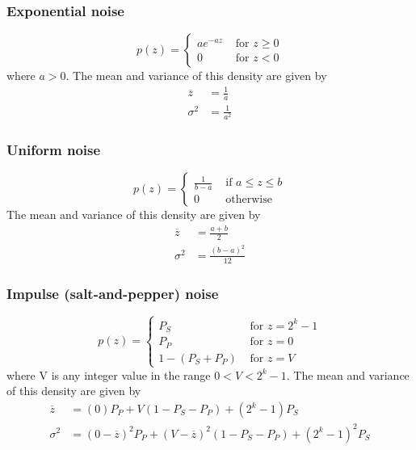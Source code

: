 	\subsubsection{Exponential noise}
		\begin{equation}
			p(z) =
				\begin{cases}
					ae^{-az} & \text{ for } z \geq 0 \\
					0 & \text{ for } z < 0
				\end{cases}
		\end{equation}
		where $a>0$. The mean and variance of this density are given by
		\begin{align}
			\overline{z} &= \frac{1}{a} \\
			\sigma^2 &= \frac{1}{a^2}
		\end{align}

	\subsubsection{Uniform noise}
		\begin{equation}
			p(z) =
				\begin{cases}
					\frac{1}{b-a} & \text{ if } a \leq z \leq b \\
					0 & \text{ otherwise }
				\end{cases}
		\end{equation}
		The mean and variance of this density are given by
		\begin{align}
			\overline{z} &= \frac{a+b}{2} \\
			\sigma^2 &= \frac{\left(b-a\right)^2}{12}
		\end{align}

	\subsubsection{Impulse (salt-and-pepper) noise}
		\begin{equation}
			p(z) =
				\begin{cases}
					P_S & \text{ for } z = 2^k-1 \\
					P_P & \text{ for } z = 0 \\
					1-(P_S+P_P) & \text{ for } z = V
				\end{cases}
		\end{equation}
		where V is any integer value in the range $0 < V < 2^k-1$. The mean and variance of this density are given by
		\begin{align}
			\overline{z} &= (0)P_P + V(1-P_S-P_P) + (2^k-1)P_S \\
			\sigma^2 &= (0-\overline{z})^2 P_P + (V-\overline{z})^2(1-P_S-P_P) + (2^k-1)^2P_S
		\end{align}

